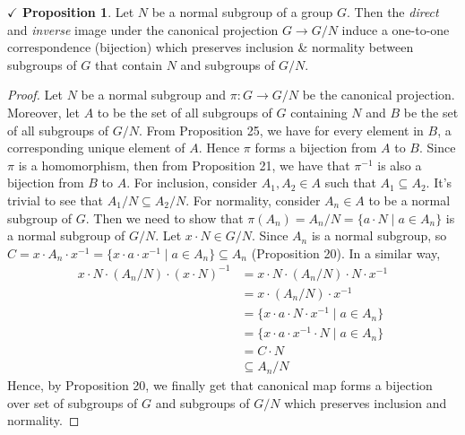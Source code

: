 \documentclass{article}
\theoremstyle{definition}
\theoremstyle{remark}
\theoremstyle{definition}
\theoremstyle{definition}
\newtheorem{proposition}{$\checkmark$ Proposition}
\theoremstyle{definition}
\theoremstyle{proof}
\newcommand{\inv}[1]{#1^{-1}}
\begin{document}
\hrulefill
\begin{proposition}
	Let $ N $ be a normal subgroup of a group $ G $. Then the \emph{direct} and \emph{inverse} image under the canonical projection $ G \longrightarrow G/N $ induce a one-to-one correspondence (bijection) which preserves inclusion \& normality between subgroups of $ G $ that contain $ N $ and subgroups of $ G/N $.
\end{proposition}
\begin{proof}
	Let $ N $ be a normal subgroup and $ \pi : G \longrightarrow G/N $ be the canonical projection. Moreover, let $ A $ to be the set of all subgroups of $ G $ containing $ N $ and $ B $ be the set of all subgroups of $ G/N $. From Proposition 25, we have for every element in $ B $, a corresponding unique element of $ A $. Hence $ \pi $ forms a bijection from $ A $ to $ B $. Since $ \pi $ is a homomorphism, then from Proposition 21, we have that $ \inv{\pi} $ is also a bijection from $ B $ to $ A $. For inclusion, consider $ A_1, A_2 \in A $ such that $ A_1 \subseteq A_2 $. It's trivial to see that $ A_1/N \subseteq A_2/N $. For normality, consider $ A_n \in A$ to be a normal subgroup of $ G $. Then we need to show that $ \pi(A_n) = A_n/N = \{a\cdot N\;\vert\;a\in A_n\}$ is a normal subgroup of $ G/N $.%
	Let $ x\cdot N \in G/N$. Since $ A_n $ is a normal subgroup, so $ C = x\cdot A_n\cdot \inv{x} = \{x\cdot a\cdot \inv{x} \;\vert\; a\in A_n\} \subseteq A_n$ (Proposition 20). In a similar way,
	\begin{equation*}
		\begin{split}
			x\cdot N\cdot (A_n/N)\cdot \inv{(x\cdot N)} &= x\cdot N\cdot (A_n/N)\cdot N\cdot\inv{x}\\
			&= x\cdot (A_n/N)\cdot \inv{x}\\
			&= \{ x\cdot a\cdot N\cdot \inv{x}\;\vert\;a\in A_n\}\\
			&= \{ x\cdot a\cdot \inv{x}\cdot N\;\vert\;a\in A_n\}\\
			&= C\cdot N\\
			&\subseteq A_n/N
		\end{split}
	\end{equation*}
Hence, by Proposition 20, we finally get that canonical map forms a bijection over set of subgroups of $ G $ and subgroups of $ G/N $ which preserves inclusion and normality.
\end{proof}
\hrulefill
\newpage
\end{document}
